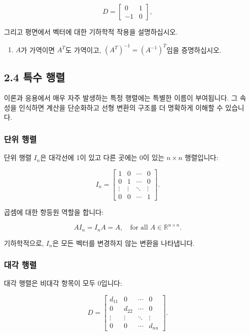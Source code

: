 \documentclass[
  12pt,
  a4paper,
]{article}
\begin{document}
\[D = \begin{bmatrix}
0 & 1 \\
-1 & 0 \end{bmatrix},\]

그리고 평면에서 벡터에 대한 기하학적 작용을 설명하십시오.

\begin{enumerate}
\def\labelenumi{\arabic{enumi}.}
\item
  \(A\)가 가역이면 \(A^T\)도 가역이고, \((A^T)^{-1} = (A^{-1})^T\)임을 증명하십시오.
\end{enumerate}

\subsection{2.4 특수 행렬}\label{24-special-matrices}

이론과 응용에서 매우 자주 발생하는 특정 행렬에는 특별한 이름이 부여됩니다. 그 속성을 인식하면 계산을 단순화하고 선형 변환의 구조를 더 명확하게 이해할 수 있습니다.

\subsubsection{단위 행렬}\label{the-identity-matrix}

단위 행렬 \(I_n\)은 대각선에 1이 있고 다른 곳에는 0이 있는 \(n \times n\) 행렬입니다:

\[I_n = \begin{bmatrix}
1 & 0 & \cdots & 0 \\
0 & 1 & \cdots & 0 \\
\vdots & \vdots & \ddots & \vdots \\
0 & 0 & \cdots & 1
\end{bmatrix}.\]

곱셈에 대한 항등원 역할을 합니다:

\[AI_n = I_nA = A, \quad \text{for all } A \in \mathbb{R}^{n \times n}.\]

기하학적으로, \(I_n\)은 모든 벡터를 변경하지 않는 변환을 나타냅니다.

\subsubsection{대각 행렬}\label{diagonal-matrices}

대각 행렬은 비대각 항목이 모두 0입니다:

\[D = \begin{bmatrix}
d_{11} & 0 & \cdots & 0 \\
0 & d_{22} & \cdots & 0 \\
\vdots & \vdots & \ddots & \vdots \\
0 & 0 & \cdots & d_{nn}
\end{bmatrix}.\]
\end{document}
